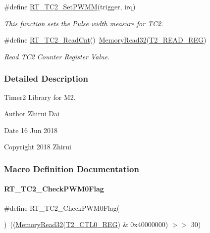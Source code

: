 \begin{DoxyCompactItemize}
\#define \mbox{\hyperlink{a00047_ad3b483689d5dd170a343222a71f43c9f}{R\+T\+\_\+\+T\+C2\+\_\+\+Set\+P\+W\+MM}}(trigger,  irq)
\begin{DoxyCompactList}\small\item\em This function sets the Pulse width measure for T\+C2. \end{DoxyCompactList}\item 
\#define \mbox{\hyperlink{a00047_a6591a513f367f6e7be0a90cb72aa3d49}{R\+T\+\_\+\+T\+C2\+\_\+\+Read\+Cnt}}()~\mbox{\hyperlink{a00020_a2d484dc15bdf30ee11ab3b05f31f0e16}{Memory\+Read32}}(\mbox{\hyperlink{a00020_adadaa0ab1ebbd7ba9b70dfd24c3ed44da2ce860fb68efa5daaac3e07dd534dd54}{T2\+\_\+\+R\+E\+A\+D\+\_\+\+R\+EG}})
\begin{DoxyCompactList}\small\item\em Read T\+C2 Counter Register Value. \end{DoxyCompactList}\end{DoxyCompactItemize}


\subsubsection{Detailed Description}
Timer2 Library for M2. 

\begin{DoxyAuthor}{Author}
Zhirui Dai 
\end{DoxyAuthor}
\begin{DoxyDate}{Date}
16 Jun 2018 
\end{DoxyDate}
\begin{DoxyCopyright}{Copyright}
2018 Zhirui 
\end{DoxyCopyright}


\subsubsection{Macro Definition Documentation}
\mbox{\label{a00047_a68bc636dca2736a8368cfd72ca9eb11a}} 
\paragraph{\texorpdfstring{R\+T\+\_\+\+T\+C2\+\_\+\+Check\+P\+W\+M0\+Flag}{RT\_TC2\_CheckPWM0Flag}}
{\footnotesize\ttfamily \#define R\+T\+\_\+\+T\+C2\+\_\+\+Check\+P\+W\+M0\+Flag(\begin{DoxyParamCaption}{ }\end{DoxyParamCaption})~((\mbox{\hyperlink{a00020_a2d484dc15bdf30ee11ab3b05f31f0e16}{Memory\+Read32}}(\mbox{\hyperlink{a00020_adadaa0ab1ebbd7ba9b70dfd24c3ed44daf2e9deb36631241181cbf09e8d959475}{T2\+\_\+\+C\+T\+L0\+\_\+\+R\+EG}}) \& 0x40000000) $>$$>$ 30)}



